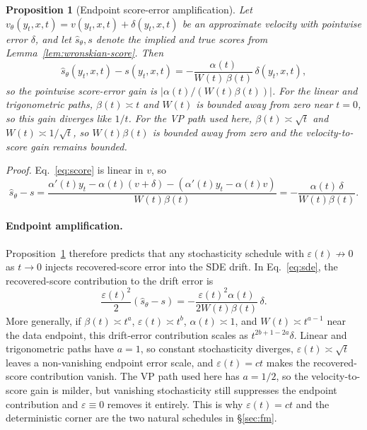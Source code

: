 \documentclass{article}
\newtheorem{proposition}{Proposition}
\begin{document}
\begin{proposition}[Endpoint score-error amplification]\label{prop:endpoint-amp}
Let $v_\theta(y_t,x,t)=v(y_t,x,t)+\delta(y_t,x,t)$ be an approximate velocity with pointwise error $\delta$, and let $\hat s_\theta,s$ denote the implied and true scores from Lemma~\ref{lem:wronskian-score}. Then
\[
\hat s_\theta(y_t,x,t)-s(y_t,x,t)=-\frac{\alpha(t)}{W(t)\,\beta(t)}\,\delta(y_t,x,t),
\]
so the pointwise score-error gain is $|\alpha(t)/(W(t)\beta(t))|$. For the linear and trigonometric paths, $\beta(t)\asymp t$ and $W(t)$ is bounded away from zero near $t=0$, so this gain diverges like $1/t$. For the VP path used here, $\beta(t)\asymp\sqrt{t}$ and $W(t)\asymp1/\sqrt{t}$, so $W(t)\beta(t)$ is bounded away from zero and the velocity-to-score gain remains bounded.
\end{proposition}
\emph{Proof.} Eq.~\eqref{eq:score} is linear in $v$, so
\[
\hat s_\theta - s
=\frac{\alpha'(t)y_t-\alpha(t)(v+\delta)-(\alpha'(t)y_t-\alpha(t)v)}{W(t)\beta(t)}
=-\frac{\alpha(t)\,\delta}{W(t)\beta(t)}. \tag*{$\square$}
\]

\paragraph{Endpoint amplification.} Proposition~\ref{prop:endpoint-amp} therefore predicts that any stochasticity schedule with $\varepsilon(t)\not\to 0$ as $t\to 0$ injects recovered-score error into the SDE drift. In Eq.~\eqref{eq:sde}, the recovered-score contribution to the drift error is
\[
\frac{\varepsilon(t)^2}{2}(\hat s_\theta-s)
=-\frac{\varepsilon(t)^2\alpha(t)}{2W(t)\beta(t)}\,\delta.
\]
More generally, if $\beta(t)\asymp t^a$, $\varepsilon(t)\asymp t^b$, $\alpha(t)\asymp1$, and $W(t)\asymp t^{a-1}$ near the data endpoint, this drift-error contribution scales as $t^{2b+1-2a}\delta$. Linear and trigonometric paths have $a=1$, so constant stochasticity diverges, $\varepsilon(t)\asymp\sqrt{t}$ leaves a non-vanishing endpoint error scale, and $\varepsilon(t)=ct$ makes the recovered-score contribution vanish. The VP path used here has $a=1/2$, so the velocity-to-score gain is milder, but vanishing stochasticity still suppresses the endpoint contribution and $\varepsilon\equiv0$ removes it entirely. This is why $\varepsilon(t)=ct$ and the deterministic corner are the two natural schedules in \S\ref{sec:fm}.
\end{document}
